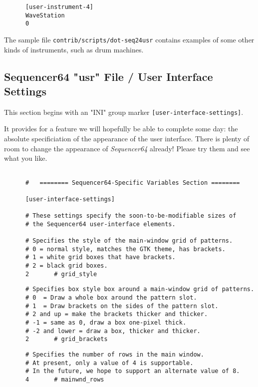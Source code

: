    \begin{verbatim}
      [user-instrument-4]
      WaveStation
      0
   \end{verbatim}

   The sample file \texttt{contrib/scripts/dot-seq24usr} contains examples
   of some other kinds of instruments, such as drum machines.

\subsection{Sequencer64 "usr" File / User Interface Settings}
\label{subsec:seq64_usr_file_user_interface_settings}

   This section begins with an
   "INI" group marker \texttt{[user-interface-settings]}.

   It provides for a feature we will hopefully be able to complete some day:
   the absolute specificiation of the appearance of the user interface.
   There is plenty of room to change the appearance of
   \textsl{Sequencer64} already!  Please try them and see what you like.

   \begin{verbatim}

      #   ======== Sequencer64-Specific Variables Section ========

      [user-interface-settings]

      # These settings specify the soon-to-be-modifiable sizes of
      # the Sequencer64 user-interface elements.

      # Specifies the style of the main-window grid of patterns.
      # 0 = normal style, matches the GTK theme, has brackets.
      # 1 = white grid boxes that have brackets.
      # 2 = black grid boxes.
      2       # grid_style
   \end{verbatim}

   \begin{verbatim}
      # Specifies box style box around a main-window grid of patterns.
      # 0  = Draw a whole box around the pattern slot.
      # 1  = Draw brackets on the sides of the pattern slot.
      # 2 and up = make the brackets thicker and thicker.
      # -1 = same as 0, draw a box one-pixel thick.
      # -2 and lower = draw a box, thicker and thicker.
      2       # grid_brackets
   \end{verbatim}

   \begin{verbatim}
      # Specifies the number of rows in the main window.
      # At present, only a value of 4 is supportable.
      # In the future, we hope to support an alternate value of 8.
      4       # mainwnd_rows
   \end{verbatim}

